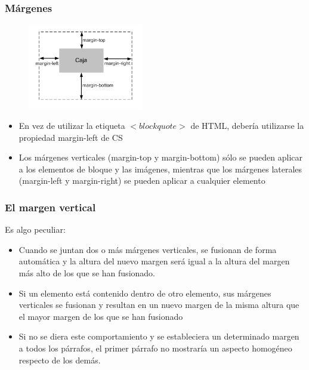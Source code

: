

\begin{frame}
\frametitle{Márgenes}


\begin{center}
\begin{figure}[p]
\includegraphics[width=0.45\textwidth]{figs/f0428.png}
\end{figure}
\end{center}

\begin{itemize}
  \item En vez de utilizar la etiqueta $<blockquote>$ de HTML, debería utilizarse la propiedad margin-left de CS
  \item Los márgenes verticales (margin-top y margin-bottom) sólo se pueden aplicar a los elementos de bloque y las imágenes, mientras que los márgenes laterales (margin-left y margin-right) se pueden aplicar a cualquier elemento
\end{itemize}

\end{frame}



\begin{frame}
\frametitle{El margen vertical}

Es algo peculiar:

\begin{itemize}
  \item Cuando se juntan dos o más márgenes verticales, se fusionan de forma automática y la altura del nuevo margen será igual a la altura del margen más alto de los que se han fusionado.
  \item Si un elemento está contenido dentro de otro elemento, sus márgenes verticales se fusionan y resultan en un nuevo margen de la misma altura que el mayor margen de los que se han fusionado
  \item Si no se diera este comportamiento y se estableciera un determinado margen a todos los párrafos, el primer párrafo no mostraría un aspecto homogéneo respecto de los demás.
\end{itemize}

\end{frame}


